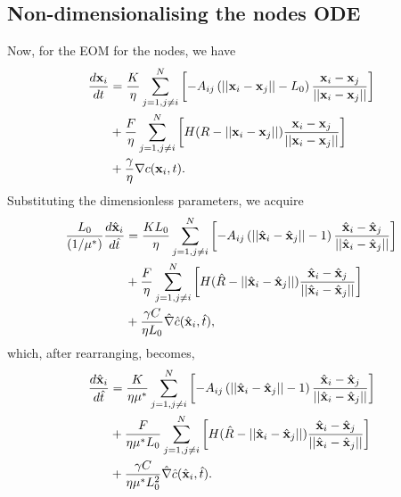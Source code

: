 \subsection{Non-dimensionalising the nodes ODE}
Now, for the EOM for the nodes, we have
\begin{equation*}
    \begin{split}
        \frac{d \vb{x}_i}{dt} &= 
        \frac{K}{ \eta}\sum_{j = 1, j \neq i}^N   \left[ - A_{ij} \left( ||\vb{x}_i - \vb{x}_j|| - L_0\right) \frac{\vb{x}_i - \vb{x}_j}{||\vb{x}_i - \vb{x}_j||} \right]\\
         &+ \frac{F}{ \eta}\sum_{j = 1, j \neq i}^N \left[ H(R - ||\vb{x}_i - \vb{x}_j||) \frac{\vb{x}_i - \vb{x}_j}{||\vb{x}_i - \vb{x}_j||}     \right]\\ 
         &+ \frac{\gamma}{\eta} \nabla c (\vb{x}_i, t).
    \end{split}
\end{equation*}
Substituting the dimensionless parameters, we acquire
\begin{equation*}
    \begin{split}
        \frac{L_0}{(1/\mu^*)}\frac{d \hat{\vb{x}}_i}{d \hat{t}} &= 
        \frac{K L_0}{ \eta}\sum_{j = 1, j \neq i}^N   \left[ - A_{ij}\left( ||\hat{\vb{x}}_i - \hat{\vb{x}}_j|| -  1\right) \frac{\hat{\vb{x}}_i - \hat{\vb{x}}_j}{||\hat{\vb{x}}_i - \hat{\vb{x}}_j||} \right]\\
         &+ \frac{F}{  \eta}\sum_{j = 1, j \neq i}^N \left[H(\hat{R} - ||\hat{\vb{x}}_i - \hat{\vb{x}}_j||) \frac{\hat{\vb{x}}_i - \hat{\vb{x}}_j}{||\hat{\vb{x}}_i - \hat{\vb{x}}_j||}     \right]\\ 
         &+ \frac{\gamma C}{ \eta L_0} \hat{\nabla}  \hat{c} (\hat{\vb{x}}_i, \hat{t}),
    \end{split}
\end{equation*}
which, after rearranging, becomes,
\begin{equation*}
    \begin{split}
        \frac{d \hat{\vb{x}}_i}{d \hat{t}} &= 
        \frac{K}{ \eta \mu^*}\sum_{j = 1, j \neq i}^N   \left[ - A_{ij}\left( ||\hat{\vb{x}}_i - \hat{\vb{x}}_j|| -  1\right) \frac{\hat{\vb{x}}_i - \hat{\vb{x}}_j}{||\hat{\vb{x}}_i - \hat{\vb{x}}_j||} \right]\\
         &+ \frac{F}{  \eta \mu^* L_0}\sum_{j = 1, j \neq i}^N \left[H(\hat{R} - ||\hat{\vb{x}}_i - \hat{\vb{x}}_j||) \frac{\hat{\vb{x}}_i - \hat{\vb{x}}_j}{||\hat{\vb{x}}_i - \hat{\vb{x}}_j||}     \right]\\ 
         &+ \frac{\gamma C}{ \eta \mu^* L_0^2} \hat{\nabla}  \hat{c} (\hat{\vb{x}}_i, \hat{t}).
    \end{split}
\end{equation*}
